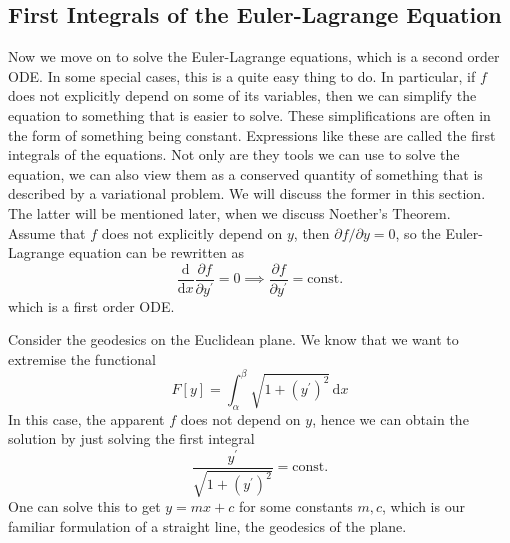 \subsection{First Integrals of the Euler-Lagrange Equation}
Now we move on to solve the Euler-Lagrange equations, which is a second order ODE.
In some special cases, this is a quite easy thing to do.
In particular, if $f$ does not explicitly depend on some of its variables, then we can simplify the equation to something that is easier to solve.
These simplifications are often in the form of something being constant.
Expressions like these are called the first integrals of the equations.
Not only are they tools we can use to solve the equation, we can also view them as a conserved quantity of something that is described by a variational problem.
We will discuss the former in this section.
The latter will be mentioned later, when we discuss Noether's Theorem.\\
Assume that $f$ does not explicitly depend on $y$, then $\partial f/\partial y=0$, so the Euler-Lagrange equation can be rewritten as
$$\frac{\mathrm d}{\mathrm dx}\frac{\partial f}{\partial y^\prime}=0\implies \frac{\partial f}{\partial y^\prime}=\text{const.}$$
which is a first order ODE.
\begin{example}
    Consider the geodesics on the Euclidean plane.
    We know that we want to extremise the functional
    $$F[y]=\int_\alpha^\beta\sqrt{1+(y^\prime)^2}\,\mathrm dx$$
    In this case, the apparent $f$ does not depend on $y$, hence we can obtain the solution by just solving the first integral
    $$\frac{y^\prime}{\sqrt{1+(y^\prime)^2}}=\text{const.}$$
    One can solve this to get $y=mx+c$ for some constants $m,c$, which is our familiar formulation of a straight line, the geodesics of the plane.
\end{example}
